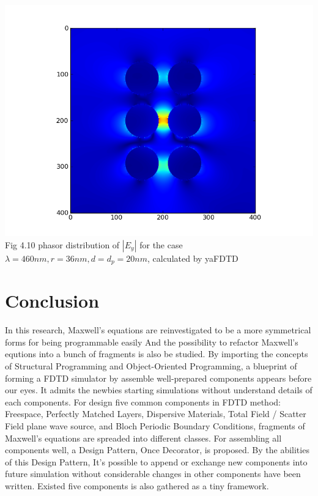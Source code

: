 \documentclass[openany]{book}
\begin{document}
\begin{center}
\includegraphics[scale=0.8]{images/ey.png}\\
Fig 4.10
phasor distribution of $|E_y|$ for the case $\lambda = 460nm, r = 36nm, d = d_p = 20nm$, calculated by yaFDTD
\end{center}




\chapter{Conclusion}
In this research, Maxwell's equations are reinvestigated to be a more symmetrical forms for being programmable easily
And the possibility to refactor Maxwell's equtions into a bunch of fragments is also be studied. By importing the
concepts of Structural Programming and Object-Oriented Programming, a blueprint of forming a FDTD simulator by assemble
well-prepared components appears before our eyes. It admits the newbies starting simulations without understand details
of each components. For design five common components in FDTD method: Freespace, Perfectly Matched Layers, Dispersive
Materials, Total Field / Scatter Field plane wave source, and Bloch Periodic Boundary Conditions, fragments of Maxwell's
equations are spreaded into different classes. For assembling all components well, a Design Pattern, Once Decorator, is
proposed. By the abilities of this Design Pattern, It's possible to append or exchange new components into future
simulation without considerable changes in other components have been written. Existed five components is also gathered
as a tiny framework.
\end{document}
